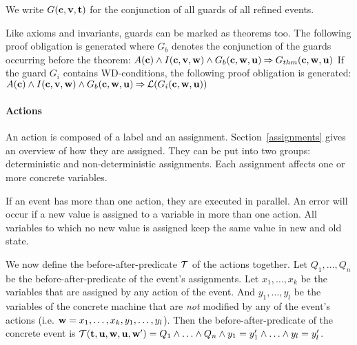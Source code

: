 We write $G(\mathbf{c},\mathbf{v},\mathbf{t})$ for the conjunction of all guards of all refined events.

Like axioms and invariants, guards can be marked as theorems too. The following
proof obligation is generated where $G_b$ denotes the conjunction of the guards occurring before the theorem:
%
{$A(\mathbf{c}) \land I(\mathbf{c},\mathbf{v},\mathbf{w}) \land G_b(\mathbf{c},\mathbf{w},\mathbf{u}) 
\mathbin\Rightarrow G_{thm}(\mathbf{c},\mathbf{w},\mathbf{u})$}
If the guard $G_i$ contains WD-conditions, the following proof obligation is generated:
%
{$A(\mathbf{c}) \land I(\mathbf{c},\mathbf{v},\mathbf{w}) \land G_b(\mathbf{c},\mathbf{w},\mathbf{u}) 
\mathbin\Rightarrow \mathcal{L}(G_i(\mathbf{c},\mathbf{w},\mathbf{u}))$}


\paragraph{Actions}
\label{actions}
An action is composed of a label and an assignment.
Section~\ref{assignments} gives an overview of how they are assigned.
They can be put into two groups: deterministic and non-deterministic assignments.
Each assignment affects one or more concrete variables.

If an event has more than one action, they are executed in parallel. 
An error will occur if a new value is assigned to a variable in more than one action.
All variables to which no new value is assigned keep the same value in new and old state.

We now define the before-after-predicate $\mathcal{T}$ of the actions together.
Let $Q_1,\ldots,Q_n$ be the before-after-predicate of the event's assignments. 
Let $x_1,\ldots,x_k$ be the variables that are assigned by any action of the event.
And $y_1,\ldots,y_l$ be the variables of the concrete machine that are \emph{not} modified by any of 
 the event's actions (i.e. $\mathbf{w} = x_1,\ldots,x_k,y_1,\ldots,y_l$).
Then the before-after-predicate of the concrete event is 
  $\mathcal{T}({\mathbf{t},\mathbf{u}},\mathbf{w},\mathbf{u},\mathbf{w}') = Q_1 \land \ldots \land Q_n \land y_1 = y_1' \land \ldots \land y_l=y_l'$.

